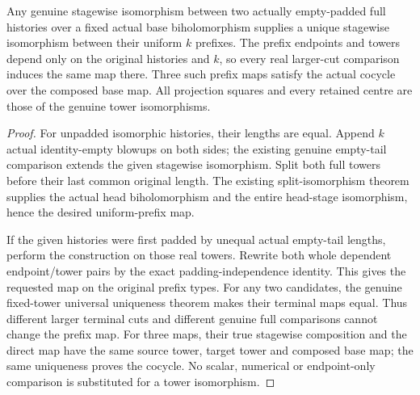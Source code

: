 \begin{theorem}
\label{hir:sharp-actual-curve-uniform-prefix-comparison}
\leanok
Any genuine stagewise isomorphism between two actually empty-padded full
histories over a fixed actual base biholomorphism supplies a unique
stagewise isomorphism between their uniform $k$ prefixes. The prefix
endpoints and towers depend only on the original histories and $k$,
so every real larger-cut comparison induces the same map there.
Three such prefix maps satisfy the actual cocycle over the composed base
map. All projection squares and every retained centre are those of
the genuine tower isomorphisms.
\end{theorem}
\begin{proof}
For unpadded isomorphic histories, their lengths are equal. Append $k$
actual identity-empty blowups on both sides; the existing genuine
empty-tail comparison extends the given stagewise isomorphism. Split
both full towers before their last common original length. The existing
split-isomorphism theorem supplies the actual head biholomorphism and
the entire head-stage isomorphism, hence the desired uniform-prefix map.

If the given histories were first padded by unequal actual empty-tail
lengths, perform the construction on those real towers. Rewrite both
whole dependent endpoint/tower pairs by the exact padding-independence
identity. This gives the requested map on the original prefix types.
For any two candidates, the genuine fixed-tower universal uniqueness
theorem makes their terminal maps equal. Thus different larger terminal
cuts and different genuine full comparisons cannot change the prefix map.
For three maps, their true stagewise composition and the direct map have
the same source tower, target tower and composed base map; the same
uniqueness proves the cocycle. No scalar, numerical or endpoint-only
comparison is substituted for a tower isomorphism.
\end{proof}

